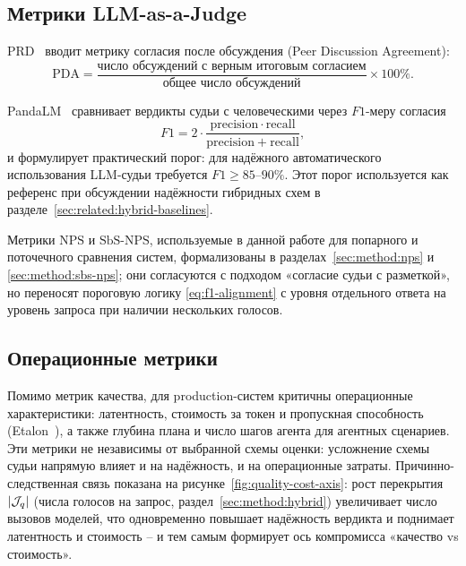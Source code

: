 \subsection{Метрики LLM-as-a-Judge}

PRD~\cite{li2023prd} вводит метрику согласия после обсуждения
(Peer Discussion Agreement):
\begin{equation}
    \label{eq:pda}
    \mathrm{PDA} =
        \frac{\text{число обсуждений с верным итоговым согласием}}
             {\text{общее число обсуждений}} \times 100\%.
\end{equation}

PandaLM~\cite{wang2023pandalm} сравнивает вердикты судьи с
человеческими через $F1$-меру согласия
\begin{equation}
    \label{eq:f1-alignment}
    F1 = 2 \cdot
        \frac{\mathrm{precision} \cdot \mathrm{recall}}
             {\mathrm{precision} + \mathrm{recall}},
\end{equation}
и формулирует практический порог: для надёжного автоматического
использования LLM-судьи требуется $F1 \ge 85$--$90\%$.
Этот порог используется как референс при обсуждении надёжности
гибридных схем в разделе~\ref{sec:related:hybrid-baselines}.

Метрики $\mathrm{NPS}$ и $\mathrm{SbS\text{-}NPS}$, используемые в
данной работе для попарного и поточечного сравнения систем,
формализованы в разделах~\ref{sec:method:nps} и
\ref{sec:method:sbs-nps}; они согласуются с подходом
«согласие судьи с разметкой», но переносят пороговую логику
\eqref{eq:f1-alignment} с уровня отдельного ответа на уровень
запроса при наличии нескольких голосов.

\subsection{Операционные метрики}

Помимо метрик качества, для production-систем критичны операционные
характеристики: латентность, стоимость за токен и пропускная
способность (Etalon~\cite{agrawal2024etalon}), а также глубина
плана и число шагов агента для агентных сценариев.
Эти метрики не независимы от выбранной схемы оценки: усложнение схемы
судьи напрямую влияет и на надёжность, и на операционные затраты.
Причинно-следственная связь показана на
рисунке~\ref{fig:quality-cost-axis}: рост перекрытия $\left\lvert\mathcal{J}_q\right\rvert$
(числа голосов на запрос, раздел~\ref{sec:method:hybrid}) увеличивает
число вызовов моделей, что одновременно повышает надёжность вердикта и
поднимает латентность и стоимость -- и тем самым формирует ось
компромисса «качество vs стоимость».

